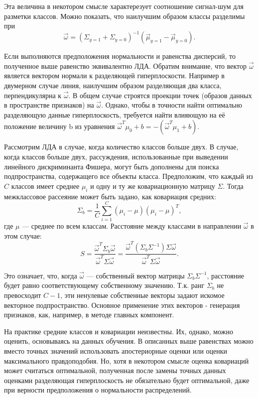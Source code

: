 Эта величина в некотором смысле характерезует соотношение сигнал-шум для
разметки классов. Можно показать, что наилучшим образом классы разделимы при
$$ \vec{\omega}=(\Sigma_{y=1}+\Sigma_{y=0})^{-1}(\vec{\mu}_{y=1}-\vec{\mu}_{y=0}). $$

Если выполняются предположения нормальности и равенства дисперсий, то полученное
выше равенство эквивалентно ЛДА. Обратим внимание, что вектор $\vec{\omega}$
является вектором нормали к разделяющей гиперплоскости. Например в двумерном
случае линия, наилучшим образом разделяющая два класса, перпендикулярна к
$\vec{\omega}$. В общем случае строятся проекции точек (образов данных в
пространстве признаков) на $\vec{\omega}$. Однако, чтобы в точности найти
оптимально разделяющую данные гиперплоскость, требуется найти влияющую на её
положение величину b из уравнения
$\vec{\omega}^T\mu_0+b=-(\vec{\omega}^T\mu_1+b)$.


Рассмотрим ЛДА в случае, когда количество классов больше двух. В случае, когда
классов больше двух, рассуждения, использованные при выведении линейного
дискриминанта Фишера, могут быть дополнены для поиска подпространства,
содержащего все объекты класса. Предположим, что каждый из $C$ классов имеет
среднее $\mu_i$ и одну и ту же ковариационную матрицу $\Sigma$. Тогда
межклассовое рассеяние может быть задано, как ковариация средних:
$$ \Sigma_b=\frac{1}{C}\sum_{i=1}^C (\mu_i-\mu)(\mu_i-\mu)^T, $$
где $\mu$ — среднее по всем классам. Расстояние между классами в направлении
$\vec{\omega}$ в этом случае:
$$
 S=\frac{\vec{\omega}^T\Sigma_b\vec{\omega}}{\vec{\omega}^T\Sigma\vec{\omega}}=\frac{\vec{\omega}^T(\Sigma_b\Sigma^{-1})\Sigma\vec{\omega}}{\vec{\omega}^T\Sigma\vec{\omega}}.
 $$


Это означает, что, когда $\vec{\omega}$ — собственный вектор матрицы
$\Sigma_b\Sigma^{-1}$, расстояние будет равно соответствующему собственному
значению. Т.к. ранг $\Sigma_b$ не превосходит $C-1$, эти ненулевые собственные
векторы задают искомое векторное подпространство. Основное применение этих
векторов - генерация признаков, как, например, в методе главных компонент.


На практике средние классов и ковариации неизвестны. Их, однако, можно оценить,
основываясь на данных обучения. В описанных выше равенствах можно вместо точных
значений использовать апостериорные оценки или оценки максимального
правдоподобия. Но, хотя в некотором смысле оценка ковариаций может считаться
оптимальной, полученная после замены точных данных оценками разделяющая
гиперплоскость не обязательно будет оптимальной, даже при верности предположения
о нормальности распределений.


